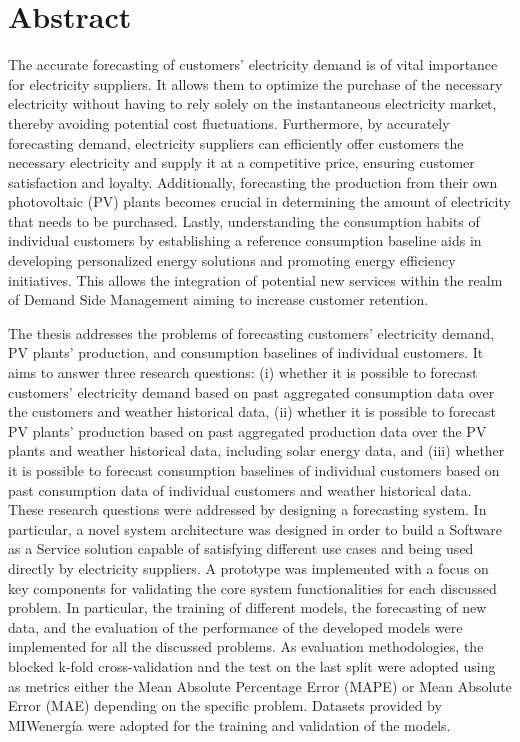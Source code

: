 \chapter*{Abstract} %
\label{abtract}

\vspace{0.4 cm}

The accurate forecasting of customers' electricity demand is of vital importance for electricity suppliers.
It allows them to optimize the purchase of the necessary electricity without having to rely solely on the instantaneous electricity market, thereby avoiding potential cost fluctuations.
Furthermore, by accurately forecasting demand, electricity suppliers can efficiently offer customers the necessary electricity and supply it at a competitive price, ensuring customer satisfaction and loyalty.
Additionally, forecasting the production from their own photovoltaic (PV) plants becomes crucial in determining the amount of electricity that needs to be purchased.
Lastly, understanding the consumption habits of individual customers by establishing a reference consumption baseline aids in developing personalized energy solutions and promoting energy efficiency initiatives.
This allows the integration of potential new services within the realm of Demand Side Management aiming to increase customer retention.

The thesis addresses the problems of forecasting customers' electricity demand, PV plants' production, and consumption baselines of individual customers.
It aims to answer three research questions:
(i) whether it is possible to forecast customers' electricity demand based on past aggregated consumption data over the customers and weather historical data,
(ii) whether it is possible to forecast PV plants' production based on past aggregated production data over the PV plants and weather historical data, including solar energy data,
and (iii) whether it is possible to forecast consumption baselines of individual customers based on past consumption data of individual customers and weather historical data.
These research questions were addressed by designing a forecasting system.
In particular, a novel system architecture was designed in order to build a Software as a Service solution capable of satisfying different use cases and being used directly by electricity suppliers.
A prototype was implemented with a focus on key components for validating the core system functionalities for each discussed problem.
In particular, the training of different models, the forecasting of new data, and the evaluation of the performance of the developed models were implemented for all the discussed problems.
As evaluation methodologies, the blocked k-fold cross-validation and the test on the last split were adopted using as metrics either the Mean Absolute Percentage Error (MAPE) or Mean Absolute Error (MAE) depending on the specific problem.
Datasets provided by MIWenergía were adopted for the training and validation of the models.


